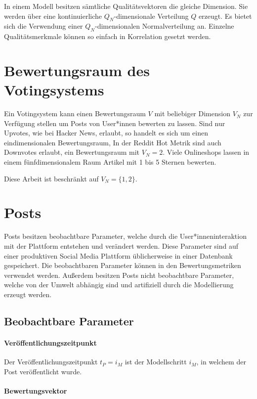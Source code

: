 In einem Modell besitzen sämtliche Qualitätsvektoren die gleiche Dimension. Sie werden über eine kontinuierliche $Q_N$-dimensionale Verteilung $Q$ erzeugt. Es bietet sich die Verwendung einer $Q_N$-dimensionalen Normalverteilung an. Einzelne Qualitätsmerkmale können so einfach in Korrelation gesetzt werden. 

\section{Bewertungsraum des Votingsystems}

Ein Votingsystem kann einen Bewertungsraum $V$ mit beliebiger Dimension $V_N$ zur Verfügung stellen um Posts von User*innen bewerten zu lassen. Sind nur Upvotes, wie bei Hacker News, erlaubt, so handelt es sich um einen eindimensionalen Bewertungsraum, In der Reddit Hot Metrik sind auch Downvotes erlaubt, ein Bewertungsraum mit $V_N = 2$. Viele Onlineshops lassen in einem fünfdimensionalem Raum Artikel mit 1 bis 5 Sternen bewerten.

Diese Arbeit ist beschränkt auf $V_N = \{1,2\}$. 

\section{Posts}

Posts besitzen beobachtbare Parameter, welche durch die User*inneninteraktion mit der Plattform entstehen und verändert werden. Diese Parameter sind auf einer produktiven Social Media Plattform üblicherweise in einer Datenbank gespeichert. Die beobachtbaren Parameter können in den Bewertungsmetriken verwendet werden.
Außerdem besitzen Posts nicht beobachtbare Parameter, welche von der Umwelt abhängig sind und artifiziell durch die Modellierung erzeugt werden.

\subsection{Beobachtbare Parameter}

\paragraph{Veröffentlichungszeitpunkt}
Der Veröffentlichungszeitpunkt $t_P = i_M$ ist der Modellschritt $i_M$, in welchem der Post veröffentlicht wurde.

\paragraph{Bewertungsvektor}

